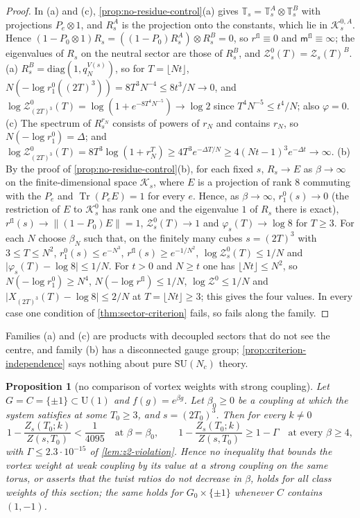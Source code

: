 \documentclass[11pt,a4paper]{amsart}
\newtheorem{proposition}[theorem]{Proposition}
\theoremstyle{definition}
\theoremstyle{remark}
\numberwithin{equation}{section}
\DeclareMathOperator{\Tr}{Tr}        %
\newcommand{\Kspace}{\mathcal{K}}    %
\newcommand{\norm}[1]{\lVert #1\rVert}     %
\newcommand{\abs}[1]{\lvert #1\rvert}      %
\newcommand{\SU}{\mathrm{SU}}              %
\newcommand{\U}{\mathrm{U}}                %
\newcommand{\TT}{\mathbb{T}}               %
\newcommand{\Zpart}[2]{Z(#1,#2)}           %
\newcommand{\Zc}{\mathcal{Z}}              %
\newcommand{\Zs}[2]{\Zc_{#1}(#2)}          %
\newcommand{\XT}[2]{X_{#1}(#2)}            %
\newcommand{\Vol}[1]{V(#1)}                %
\newcommand{\cube}[1]{(2#1)^3}             %
\newcommand{\Mcirc}{\text{\upshape(M$^{\circ}$)}}   %
\newcommand{\Bcirc}{\text{\upshape(B$^{\circ}$)}}   %
\begin{document}
\begin{proof}
In (a) and (c), \cref{prop:no-residue-control}\textup{(a)} gives $\TT_s=\TT^A_s\otimes\TT^B_s$ with projections $P_e\otimes1$, and $R^A_s$ is the projection onto the constants, which lie in $\Kspace^{0,A}_s$. Hence $(1-P_0\otimes1)R_s=((1-P_0)R^A_s)\otimes R^B_s=0$, so $r^{\mathrm{fl}}\equiv0$ and $\mathsf m^{\mathrm{fl}}\equiv\infty$; the eigenvalues of $R_s$ on the neutral sector are those of $R^B_s$, and $\Zc^0_s(T)=\Zs{s}{T}^B$. (a) $R^B_s=\mathrm{diag}(1,q_N^{\Vol{s}})$, so for $T=\lfloor Nt\rfloor$, $N(-\log r_1^0(\cube T))=8T^3N^{-4}\le8t^3/N\to0$, and $\log\Zc^0_{\cube T}(T)=\log(1+e^{-8T^4N^{-5}})\to\log2$ since $T^4N^{-5}\le t^4/N$; also $\varphi=0$. (c) The spectrum of $R^{r_N}_s$ consists of powers of $r_N$ and contains $r_N$, so $N(-\log r_1^0)=\Delta$; and $\log\Zc^0_{\cube T}(T)=8T^3\log(1+r_N^T)\ge4T^3e^{-\Delta T/N}\ge4(Nt-1)^3e^{-\Delta t}\to\infty$. (b) By the proof of \cref{prop:no-residue-control}\textup{(b)}, for each fixed $s$, $R_s\to E$ as $\beta\to\infty$ on the finite-dimensional space $\Kspace_s$, where $E$ is a projection of rank $8$ commuting with the $P_e$ and $\Tr(P_eE)=1$ for every $e$. Hence, as $\beta\to\infty$, $r_1^0(s)\to0$ (the restriction of $E$ to $\Kspace^0_s$ has rank one and the eigenvalue $1$ of $R_s$ there is exact), $r^{\mathrm{fl}}(s)\to\norm{(1-P_0)E}=1$, $\Zc^0_s(T)\to1$ and $\varphi_s(T)\to\log8$ for $T\ge3$. For each $N$ choose $\beta_N$ such that, on the finitely many cubes $s=\cube T$ with $3\le T\le N^2$, $r_1^0(s)\le e^{-N^3}$, $r^{\mathrm{fl}}(s)\ge e^{-1/N^2}$, $\log\Zc^0_s(T)\le1/N$ and $\abs{\varphi_s(T)-\log8}\le1/N$. For $t>0$ and $N\ge t$ one has $\lfloor Nt\rfloor\le N^2$, so $N(-\log r_1^0)\ge N^4$, $N(-\log r^{\mathrm{fl}})\le1/N$, $\log\Zc^0\le1/N$ and $\abs{\XT{\cube T}{T}-\log8}\le2/N$ at $T=\lfloor Nt\rfloor\ge3$; this gives the four values. In every case one condition of \cref{thm:sector-criterion} fails, so \Mcirc{} fails along the family.
\end{proof}

Families (a) and (c) are products with decoupled sectors that do not see the centre, and family (b) has a disconnected gauge group; \cref{prop:criterion-independence} says nothing about pure $\SU(N_c)$ theory.

\begin{proposition}[no comparison of vortex weights with strong coupling]\label{prop:no-vortex-comparison}
Let $G=C=\{\pm1\}\subset\U(1)$ and $f(g)=e^{\beta g}$. Let $\beta_0\ge0$ be a coupling at which the system satisfies \Bcirc{} at some $T_0\ge3$, and $s=\cube{T_0}$. Then for every $k\ne0$
\[
1-\frac{Z_s(T_0;k)}{\Zpart{s}{T_0}}<\frac1{4095}\quad\text{at }\beta=\beta_0,\qquad 1-\frac{Z_s(T_0;k)}{\Zpart{s}{T_0}}\ge1-\Gamma\quad\text{at every }\beta\ge4,
\]
with $\Gamma\le2.3\cdot10^{-15}$ of \cref{lem:z2-violation}. Hence no inequality that bounds the vortex weight at weak coupling by its value at a strong coupling on the same torus, or asserts that the twist ratios do not decrease in $\beta$, holds for all class weights of this section; the same holds for $G_0\times\{\pm1\}$ whenever $C$ contains $(1,-1)$.
\end{proposition}
\end{document}
